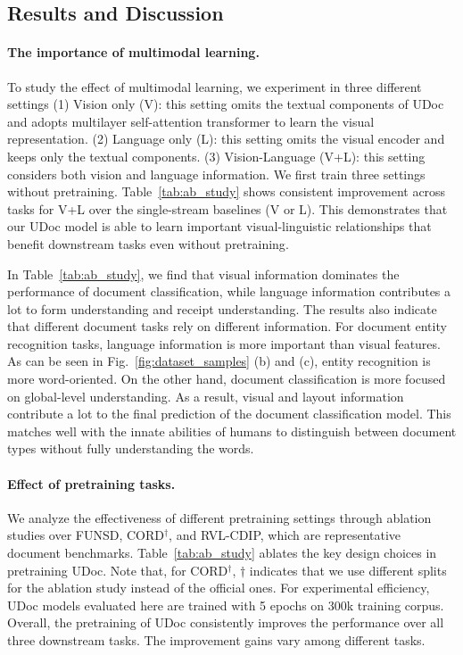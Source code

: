 \documentclass{article}
\begin{document}
	\subsection{Results and Discussion}\label{sec:abliation_study}
	\paragraph{The importance of multimodal learning.}
	To study the effect of multimodal learning, we experiment {in} three different settings (1) Vision only (V): this {setting omits the textual components of} UDoc and adopts multilayer self-attention transformer to learn the visual representation. (2) Language only (L): this setting {omits} the {visual} encoder and keeps {only} the {textual components}. (3) Vision-Language (V+L): this setting considers both vision and language {information}. We first train three settings without pretraining. Table~\ref{tab:ab_study} shows consistent improvement across tasks for V+L over the single-stream baselines (V or L). 
	This demonstrates that our UDoc model is able to learn important visual-linguistic relationships that {benefit} downstream tasks {even without pretraining}.
	
	In Table~\ref{tab:ab_study}, we {find} that {visual} information dominates the performance of document classification, while language information contributes a lot to form understanding and receipt understanding. The results also {indicate} that different document tasks rely on different information. For document entity recognition tasks, language information {is more important} than visual features. As can be seen in Fig.~\ref{fig:dataset_samples} (b) and (c), entity recognition is more {word-oriented}. {On the other hand,} document classification is more focused on global{-level} understanding. {As a result, } visual and layout information contribute a lot to the final prediction {of the document classification model}. This {matches well} with {the innate abilities of humans to distinguish between} {document types} without {fully understand{ing}} the words. 
	
	\paragraph{Effect of pretraining tasks.}
	We analyze the effectiveness of different pretraining settings through ablation studies over FUNSD, CORD$^\dagger$, and RVL-CDIP, {which are} representative document benchmarks. Table~\ref{tab:ab_study} ablates {the} key design choices in pretraining UDoc. Note that, for CORD$^\dagger$, $\dagger$ indicates that we use different splits for the ablation study instead of the official ones. For experimental efficiency, UDoc {models evaluated here} are {trained with} 5 epochs on 300k training corpus. Overall, the pretraining of UDoc {consistently} improves the performance over all three downstream tasks. The improvement {gains vary among} different tasks.
	
\end{document}
